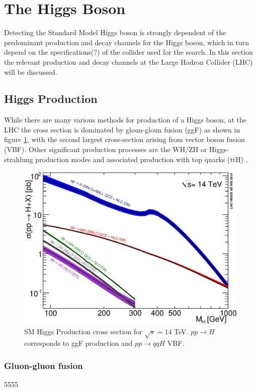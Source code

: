 \section{The Higgs Boson}

	Detecting the Standard Model Higgs boson is strongly dependent of the predominant production and decay channels for the Higgs boson, which in turn depend on the specifications(?) of the collider used for the search. In this section the relevant production and decay channels at the Large Hadron Collider (LHC) will be discussed.

	\subsection{Higgs Production}
	
		While there are many various methods for production of a Higgs boson, at the LHC the cross section is dominated by gloun-gloun fusion (ggF) as shown in figure \ref{fig:higgsproductionCS}, with the second largest cross-section arising from vector boson fusion (VBF). Other significant production processes are the WH/ZH or Higgs-strahlung production modes and associated production with top quarks (ttH) \cite{LHCHiggsCS}. 
		
			\begin{figure}[h]
				\centering
				\includegraphics[width=0.7\linewidth]{T/FIGS/YRHXS_Summary_fig3}
				\caption{SM Higgs Production cross section for $\sqrt{s}=14$ TeV. $pp\rightarrow H$ corresponds to ggF production and $pp\rightarrow qqH$ VBF. \cite{LHCHiggsCS}}
				\label{fig:higgsproductionCS}
			\end{figure}
		
		\subsubsection{Gluon-gluon fusion}5555
		
